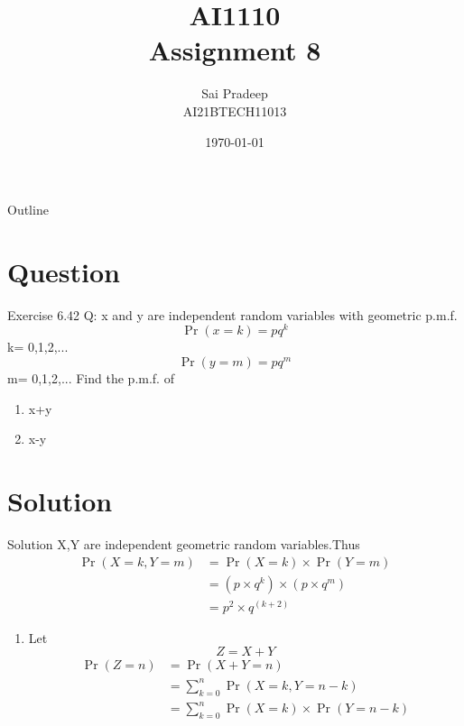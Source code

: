 \documentclass{beamer}
\title{AI1110 \\ Assignment 8}
\author{Sai Pradeep \\ AI21BTECH11013}
\date{\today}
\providecommand{\pr}[1]{\ensuremath{\Pr\left(#1\right)}}
\begin{document}
	\begin{frame}
		\titlepage
	\end{frame}
	
	\begin{frame}{Outline}
    		\tableofcontents
	\end{frame}
	
	\section{Question}
	\begin{frame}{Exercise 6.42}
	Q: x and y are independent random variables with geometric p.m.f.
	$$\pr{x=k}=p q^k$$ k= 0,1,2,... $$\pr{y=m}=p q^m $$ m= 0,1,2,...
 Find the p.m.f. of
\begin{enumerate}[label=(\alph*)]
 \item x+y
 \item x-y
 \end{enumerate}	
	\end{frame}

	\section{Solution}
	\begin{frame}{Solution}
    X,Y are independent geometric random variables.Thus
    \begin{align}
    \pr{X=k,Y=m} &= \pr{X=k} \times \pr{Y=m}\\
    &=(p \times q^k) \times (p \times q^m)\\
    &=p^2 \times q^(k+2)
    \end{align}
\begin{enumerate}[label=(\alph*)]
     \item  Let $$Z=X+Y$$
     \begin{align}
     \pr{Z=n}&=\pr{X+Y=n}\\
     &=\sum\limits_{k=0}^n \pr{X=k,Y=n-k}\\ 
     &=\sum\limits_{k=0}^n \pr{X=k} \times \pr{Y=n-k}
     \end{align}
    \end{enumerate}
    \end{frame}
    
\end{document}
